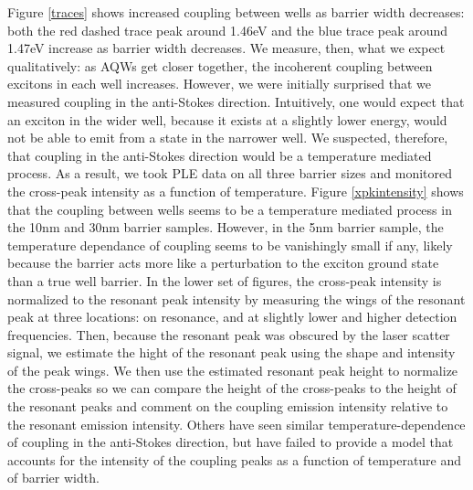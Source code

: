 \indent Figure \ref{traces} shows increased coupling between wells as barrier width decreases: both the red dashed trace peak around 1.46eV and the blue trace peak around 1.47eV increase as barrier width decreases. We measure, then, what we expect qualitatively: as AQWs get closer together, the incoherent coupling between excitons in each well increases. However, we were initially surprised that we measured coupling in the anti-Stokes direction. Intuitively, one would expect that an exciton in the wider well, because it exists at a slightly lower energy, would not be able to emit from a state in the narrower well. We suspected, therefore, that coupling in the anti-Stokes direction would be a temperature mediated process. As a result, we took PLE data on all three barrier sizes and monitored the cross-peak intensity as a function of temperature. Figure \ref{xpkintensity} shows that the coupling between wells seems to be a temperature mediated process in the 10nm and 30nm barrier samples. However, in the 5nm barrier sample, the temperature dependance of coupling seems to be vanishingly small if any, likely because the barrier acts more like a perturbation to the exciton ground state than a true well barrier. In the lower set of figures, the cross-peak intensity is normalized to the resonant peak intensity by measuring the wings of the resonant peak at three locations: on resonance, and at slightly lower and higher detection frequencies. Then, because the resonant peak was obscured by the laser scatter signal, we estimate the hight of the resonant peak using the shape and intensity of the peak wings. We then use the estimated resonant peak height to normalize the cross-peaks so we can compare the height of the cross-peaks to the height of the resonant peaks and comment on the coupling emission intensity relative to the resonant emission intensity. Others have seen similar temperature-dependence of coupling in the anti-Stokes direction, \cite{borri} but have failed to provide a model that accounts for the intensity of the coupling peaks as a function of temperature and of barrier width. 
